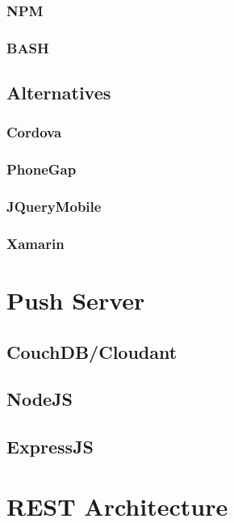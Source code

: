 \subsubsection{NPM}

\subsubsection{BASH}

\subsection{Alternatives}
\subsubsection{Cordova}

\subsubsection{PhoneGap}

\subsubsection{JQueryMobile}

\subsubsection{Xamarin}

\section{Push Server}


\subsection{CouchDB/Cloudant}

\subsection{NodeJS}

\subsection{ExpressJS}


\section{REST Architecture}	%
